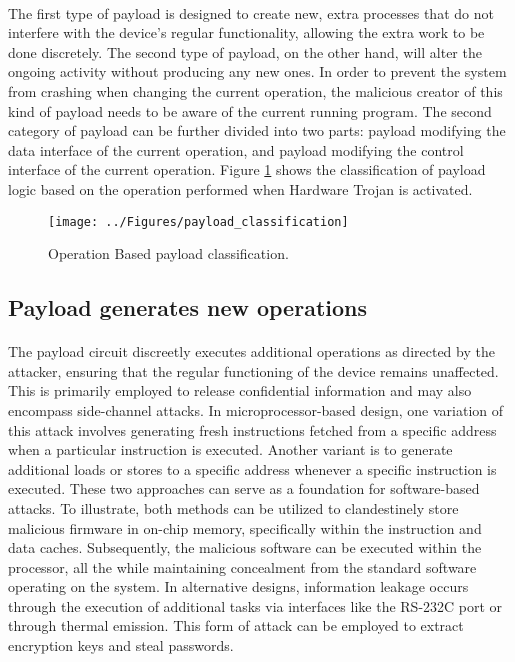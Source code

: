 \paragraph*{}
The first type of payload is designed to create new, extra processes that do not interfere with the device's regular functionality, allowing the extra work to be done discretely. The second type of payload, on the other hand, will alter the ongoing activity without producing any new ones. In order to prevent the system from crashing when changing the current operation, the malicious creator of this kind of payload needs to be aware of the current running program. The second category of payload can be further divided into two parts: payload modifying the data interface of the current operation, and payload modifying the control interface of the current operation. Figure \ref{fig:payloadclassification} shows the classification of payload logic based on the operation performed when Hardware Trojan is activated.
\begin{figure}[h]
	\centering
	\texttt{[image: ../Figures/payload\_classification]}
	\caption{Operation Based payload classification.}
	\label{fig:payloadclassification}
\end{figure}
\subsection{Payload generates new operations}
\paragraph*{}
The payload circuit discreetly executes additional operations as directed by the attacker, ensuring that the regular functioning of the device remains unaffected. This is primarily employed to release confidential information and may also encompass side-channel attacks. In microprocessor-based design, one variation of this attack involves generating fresh instructions fetched from a specific address when a particular instruction is executed. Another variant is to generate additional loads or stores to a specific address whenever a specific instruction is executed. These two approaches can serve as a foundation for software-based attacks. To illustrate, both methods can be utilized to clandestinely store malicious firmware in on-chip memory, specifically within the instruction and data caches. Subsequently, the malicious software can be executed within the processor, all the while maintaining concealment from the standard software operating on the system. In alternative designs, information leakage occurs through the execution of additional tasks via interfaces like the RS-232C port or through thermal emission. This form of attack can be employed to extract encryption keys and steal passwords.

